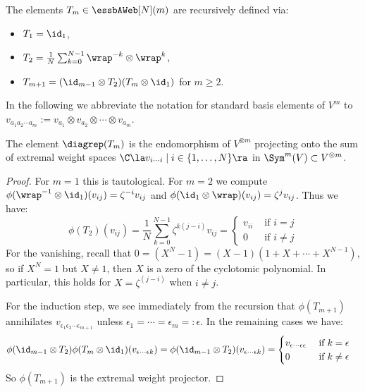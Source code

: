 \begin{defi}\label{def:T} The elements $T_m\in\essbAWeb[N](m)$ are recursively defined via:
\begin{itemize} 
\item $T_1=\id_1$,
\item $T_2=\frac{1}{N}\sum_{k=0}^{N-1} \wrap^{-k}\otimes \wrap^k$,
\item $T_{m+1}=(\id_{m-1}\otimes T_2)(T_m\otimes \id_1)$ for $m\geq 2$.
\end{itemize}
\end{defi}


 In the following we abbreviate the notation for standard basis elements of $V^m$ to $v_{a_1 a_2
\cdots a_m}:=v_{a_1}\otimes v_{a_2} \otimes \cdots \otimes v_{a_m}$.

\begin{theo} \label{thm:extweightproj} The element $\diagrep(T_m)$ is the
  endomorphism of $V^{\otimes m}$ projecting onto the sum of extremal weight spaces
  $\C\la v_{i\cdots i}\mid i\in \{1,\dots,N\}\ra$ in $\Sym^m(V)\subset V^{\otimes
  m}$.
\end{theo}
\begin{proof} For $m=1$ this is tautological. For $m=2$ we compute $\phi( \wrap^{-1}\otimes \id_1)(v_{i j})=\zeta^{-i} v_{i j}$ and $\phi(\id_1 \otimes \wrap)(v_{i j})=\zeta^{j} v_{i j}$. Thus we have:
\[\phi(T_2)(v_{i j}) =  \frac{1}{N}\sum_{k=0}^{N-1} \zeta^{k(j-i)} v_{i j} = \begin{cases} v_{i i} &\text{ if } i=j\\
0 &\text{ if } i \neq j
\end{cases}\]
For the vanishing, recall that $0=(X^N-1)=(X-1)(1+X+\cdots+X^{N-1})$, so if $X^N=1$ but $X\neq 1$, then $X$ is a zero of the cyclotomic polynomial. %
In particular, this holds for $X=\zeta^{(j-i)}$ when $i\neq j$.

For the induction step, we see immediately from the recursion that $\phi(T_{m+1})$ annihilates $v_{\epsilon_1 \epsilon_2\cdots \epsilon_{m+1}}$ unless $\epsilon_1=\cdots=\epsilon_{m}=:\epsilon$. In the remaining cases we have:
\begin{align*}
\phi(\id_{m-1}\otimes T_2)\phi(T_m\otimes \id_1)(v_{\epsilon\cdots \epsilon k}) &= \phi(\id_{m-1}\otimes T_2)(v_{\epsilon\cdots \epsilon k}) =\begin{cases} v_{\epsilon \cdots \epsilon \epsilon} &\text{ if } k=\epsilon\\ 0 &\text{ if } k\neq \epsilon \end{cases}
\end{align*} 
So $\phi(T_{m+1})$ is the extremal weight projector.
\end{proof}

